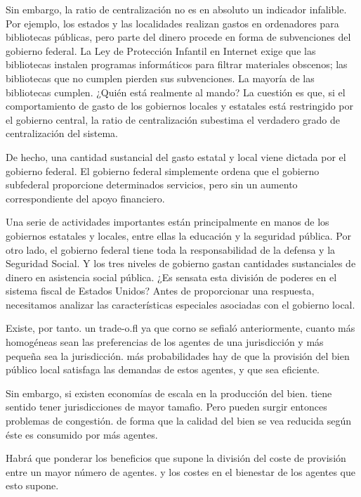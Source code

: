 \documentclass[10pt,a4paper]{article}
\begin{document}
Sin embargo, la ratio de centralización no es en absoluto un indicador infalible. Por ejemplo, los estados y las localidades realizan gastos en ordenadores para bibliotecas públicas, pero parte del dinero procede en forma de subvenciones del gobierno federal. La Ley de Protección Infantil en Internet exige que las bibliotecas instalen programas informáticos para filtrar materiales obscenos; las bibliotecas que no cumplen pierden sus subvenciones. La mayoría de las bibliotecas cumplen. ¿Quién está realmente al mando? La cuestión es que, si el comportamiento de gasto de los gobiernos locales y estatales está restringido por el gobierno central, la ratio de centralización subestima el verdadero grado de centralización del sistema.

De hecho, una cantidad sustancial del gasto estatal y local viene dictada por el gobierno federal. El gobierno federal simplemente ordena que el gobierno subfederal proporcione determinados servicios, pero sin un aumento correspondiente del apoyo financiero.

Una serie de actividades importantes están principalmente en manos de los gobiernos estatales y locales, entre ellas la educación y la seguridad pública. Por otro lado, el gobierno federal tiene toda la responsabilidad de la defensa y la Seguridad Social. Y los tres niveles de gobierno gastan cantidades sustanciales de dinero en asistencia social pública. ¿Es sensata esta división de poderes en el sistema fiscal de Estados Unidos? Antes de proporcionar una respuesta, necesitamos analizar las características especiales asociadas con el gobierno local.

Existe, por tanto. un trade-o.fl ya que corno se sefialó anteriormente, cuanto más homogéneas sean las preferencias de los agentes de una jurisdicción y más pequeña sea la jurisdicción. más probabilidades hay de que la provisión del bien público local satisfaga las demandas de estos agentes, y que sea eficiente.

Sin embargo, si existen economías de escala en la producción del bien. tiene sentido tener jurisdicciones de mayor tamafio. Pero pueden surgir entonces problemas de congestión. de forma que la calidad del bien se vea reducida según éste es consumido por más agentes.

Habrá que ponderar los beneficios que supone la división del coste de provisión entre un mayor número de agentes. y los costes en el bienestar de los agentes que esto supone. 
\end{document}
